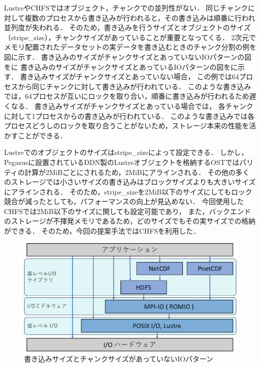 \documentclass[submit,techrep,noauthor]{ipsj}
\begin{document}
LustreやCHFSではオブジェクト，チャンクでの並列性がない．
同じチャンクに対して複数のプロセスから書き込みが行われると，その書き込みは順番に行われ並列度が失われる．
そのため，書き込みを行うサイズとオブジェクトのサイズ（stripe\_size），チャンクサイズがあっていることが重要となってくる．
2次元でメモリ配置されたデータセットの実データを書き込むときのチャンク分割の例を図に示す．
書き込みのサイズがチャンクサイズとあっていないIOパターンの図をに
書き込みのサイズがチャンクサイズとあっているIOパターンの図をに示す．
書き込みサイズがチャンクサイズとあっていない場合，
この例では64プロセスから同じチャンクに対して書き込みが行われている．
このような書き込みでは，64プロセスが互いにロックを取り合い，順番に書き込みが行われるため遅くなる．
書き込みサイズがチャンクサイズとあっている場合では，
各チャンクに対して1プロセスからの書き込みが行われている．
このような書き込みでは各プロセスどうしのロックを取り合うことがないため，ストレージ本来の性能を活かすことができる．

Lustreでのオブジェクトのサイズはstripe\_sizeによって設定できる．
しかし，Pegasusに設置されているDDN製のLustreオブジェクトを格納するOSTではパリティの計算が2MiBごとにされるため，2MiBにアラインされる．
その他の多くのストレージでは小さいサイズの書き込みはブロックサイズよりも大きいサイズにアラインされる．
そのため，stripe\_sizeを2MiB以下のサイズにしてもロック競合が減ったとしても，パフォーマンスの向上が見込めない．
今回使用したCHFSでは2MiB以下のサイズに関しても設定可能であり，
また，バックエンドのストレージが不揮発メモリであるため，どのサイズでもその実サイズでの格納ができる．
そのため，今回の提案手法ではCHFSを利用した．


\begin{figure}[t]
	\centering
	\includegraphics[page=14,width=\linewidth]{figure-crop.pdf}
	\caption{書き込みサイズとチャンクサイズがあっていないIOパターン}
	\label{fig:wrongio}
\end{figure}
\end{document}
